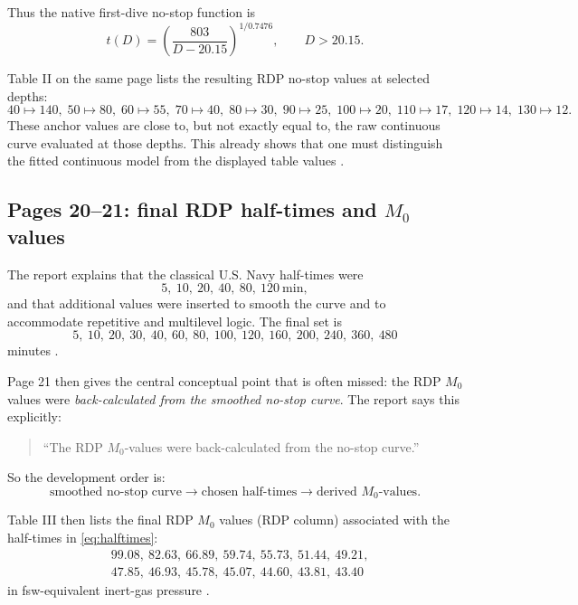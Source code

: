 \documentclass[11pt]{article}
\begin{document}
Thus the native first-dive no-stop function is
\begin{equation}
t(D) = \left(\frac{803}{D-20.15}\right)^{1/0.7476},
\qquad D > 20.15.
\label{eq:curveinverse}
\end{equation}

Table II on the same page lists the resulting RDP no-stop values at selected depths:
\[
40\mapsto 140,\;
50\mapsto 80,\;
60\mapsto 55,\;
70\mapsto 40,\;
80\mapsto 30,\;
90\mapsto 25,\;
100\mapsto 20,\;
110\mapsto 17,\;
120\mapsto 14,\;
130\mapsto 12.
\]
These anchor values are close to, but not exactly equal to, the raw continuous curve evaluated at those depths. This already shows that one must distinguish the fitted continuous model from the displayed table values \cite[p.~20]{Hamilton1994}.

\subsection{Pages 20--21: final RDP half-times and $M_0$ values}

The report explains that the classical U.S. Navy half-times were
\[
5,\ 10,\ 20,\ 40,\ 80,\ 120\ \text{min},
\]
and that additional values were inserted to smooth the curve and to accommodate repetitive and multilevel logic. The final set is
\begin{equation}
5,\ 10,\ 20,\ 30,\ 40,\ 60,\ 80,\ 100,\ 120,\ 160,\ 200,\ 240,\ 360,\ 480
\label{eq:halftimes}
\end{equation}
minutes \cite[pp.~20--21]{Hamilton1994}.

Page 21 then gives the central conceptual point that is often missed: the RDP $M_0$ values were \emph{back-calculated from the smoothed no-stop curve}. The report says this explicitly:
\begin{quote}
``The RDP $M_0$-values were back-calculated from the no-stop curve.'' \cite[p.~21]{Hamilton1994}
\end{quote}
So the development order is:
\[
\text{smoothed no-stop curve} \longrightarrow \text{chosen half-times} \longrightarrow \text{derived } M_0\text{-values}.
\]

Table III then lists the final RDP $M_0$ values (RDP column) associated with the half-times in \eqref{eq:halftimes}:
\begin{equation}
\begin{aligned}
&99.08,\ 82.63,\ 66.89,\ 59.74,\ 55.73,\ 51.44,\ 49.21,\\
&47.85,\ 46.93,\ 45.78,\ 45.07,\ 44.60,\ 43.81,\ 43.40
\end{aligned}
\label{eq:m0}
\end{equation}
in fsw-equivalent inert-gas pressure \cite[p.~21]{Hamilton1994}.
\end{document}

